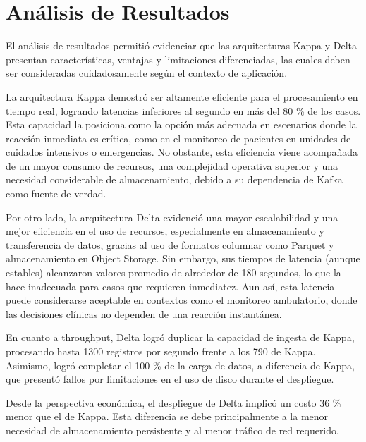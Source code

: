 \section{Análisis de Resultados}

El análisis de resultados permitió evidenciar que las arquitecturas Kappa y Delta presentan características, 
ventajas y limitaciones diferenciadas, las cuales deben ser consideradas cuidadosamente según el contexto de aplicación. \newline

La arquitectura Kappa demostró ser altamente eficiente para el procesamiento en tiempo real, logrando latencias inferiores al segundo en más del 80 \% de los casos. 
Esta capacidad la posiciona como la opción más adecuada en escenarios donde la reacción inmediata es crítica, 
como en el monitoreo de pacientes en unidades de cuidados intensivos o emergencias. 
No obstante, esta eficiencia viene acompañada de un mayor consumo de recursos, 
una complejidad operativa superior y una necesidad considerable de almacenamiento, 
debido a su dependencia de Kafka como fuente de verdad. \newline

Por otro lado, la arquitectura Delta evidenció una mayor escalabilidad y una mejor eficiencia en el uso de recursos, 
especialmente en almacenamiento y transferencia de datos, gracias al uso de formatos columnar como Parquet y almacenamiento en Object Storage. 
Sin embargo, sus tiempos de latencia (aunque estables) alcanzaron valores promedio de alrededor de 180 segundos, 
lo que la hace inadecuada para casos que requieren inmediatez. Aun así, esta latencia puede considerarse aceptable en contextos como el monitoreo ambulatorio, 
donde las decisiones clínicas no dependen de una reacción instantánea. \newline

En cuanto a throughput, Delta logró duplicar la capacidad de ingesta de Kappa, 
procesando hasta 1300 registros por segundo frente a los 790 de Kappa. 
Asimismo, logró completar el 100 \% de la carga de datos, a diferencia de Kappa, 
que presentó fallos por limitaciones en el uso de disco durante el despliegue. \newline

Desde la perspectiva económica, el despliegue de Delta implicó un costo 36 \% menor que el de Kappa. 
Esta diferencia se debe principalmente a la menor necesidad de almacenamiento persistente y al menor tráfico de red requerido.\newline

